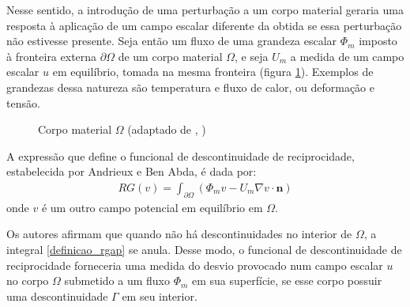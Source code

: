 Nesse sentido, a introdução de uma perturbação a um corpo material geraria uma resposta à aplicação de um campo escalar diferente da obtida se
essa perturbação não estivesse presente. Seja então um fluxo de uma grandeza escalar $\Phi_m$ imposto à fronteira externa $\partial\Omega$ de um corpo material
$\Omega$, e seja $U_m$ a medida de um campo escalar $u$ em equilíbrio, tomada na mesma fronteira (figura \ref{fig3}). Exemplos de grandezas dessa natureza são
temperatura e fluxo de calor, ou deformação e tensão. 
\begin{figure}[h!b]
\begin{center}
\caption{Corpo material $\Omega$ (adaptado de \citeauthor{artigo_andrieux}, \citeyear{artigo_andrieux})}
\label{fig3}
\end{center}
\end{figure}

A expressão que define o funcional de descontinuidade de reciprocidade, estabelecida por Andrieux e Ben Abda, é dada por:
\begin{align}
	RG(v) = \int_{\partial\Omega} \left( \Phi_m v - U_m \nabla v \cdot \mathbf{n} \right) \label{definicao_rgap}
\end{align}
onde $v$ é um outro campo potencial em equilíbrio em $\Omega$.

Os autores afirmam que quando não há descontinuidades no interior de $\Omega$, a integral \eqref{definicao_rgap} se anula. Desse modo, o funcional de descontinuidade de reciprocidade
forneceria uma medida do desvio provocado num campo escalar $u$ no corpo $\Omega$ submetido a um fluxo $\Phi_m$ em sua superfície, se esse corpo
possuir uma descontinuidade $\Gamma$ em seu interior.

